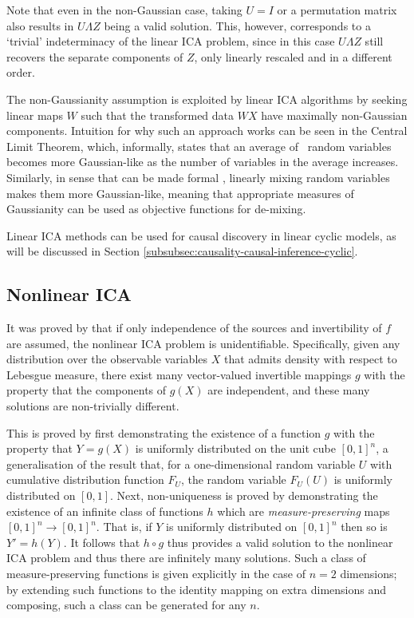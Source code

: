 Note that even in the non-Gaussian case, taking $U=I$ or a permutation matrix also results in $U\Lambda Z$ being a valid solution. 
This, however, corresponds to a `trivial' indeterminacy of the linear ICA problem, since in this case $U\Lambda Z$ still recovers the separate components of $Z$, only linearly rescaled and in a different order.

The non-Gaussianity assumption is exploited by linear ICA algorithms by seeking linear maps $W$ such that the transformed data ${W}X$ have maximally non-Gaussian components.
Intuition for why such an approach works can be seen in the Central Limit Theorem, which, informally, states that an average of \iid~random variables becomes more Gaussian-like as the number of variables in the average increases. 
Similarly, in sense that can be made formal \citep{hyvarinen2000independent}, linearly mixing random variables makes them more Gaussian-like, meaning that appropriate measures of Gaussianity can be used as objective functions for de-mixing.

Linear ICA methods can be used for causal discovery in linear cyclic models, as will be discussed in Section \ref{subsubsec:causality-causal-inference-cyclic}.





\subsection{Nonlinear ICA}\label{subsec:ica-literature-nonlinear-ica}
 
It was proved by \cite{hyvarinen1999nonlinear} that if only independence of the sources and invertibility of $f$ are assumed, the nonlinear ICA problem is unidentifiable.
Specifically, given any distribution over the observable variables $X$ that admits density with respect to Lebesgue measure, there exist many vector-valued invertible mappings $g$ with the property that the components of $g(X)$ are independent, and these many solutions are non-trivially different.

This is proved by first demonstrating the existence of a function $g$ with the property that $Y=g(X)$ is uniformly distributed on the unit cube $[0, 1]^n$,
a generalisation of the result that, for a one-dimensional random variable $U$  with cumulative distribution function $F_U$, the random variable $F_U(U)$ is uniformly distributed on $[0,1]$.
Next, non-uniqueness is proved by demonstrating the existence of an infinite class of functions $h$ which are \emph{measure-preserving} maps $[0,1]^n \to [0,1]^n$. 
That is, if $Y$ is uniformly distributed on $[0,1]^n$ then so is  $Y' = {h}({Y})$.
It follows that ${h}\circ {g}$ thus provides a valid solution to the nonlinear ICA problem and thus there are infinitely many solutions. 
Such a class of measure-preserving functions is given explicitly in the case of $n=2$ dimensions; by extending such functions to the identity mapping on extra dimensions and composing, such a class can be generated for any $n$.

